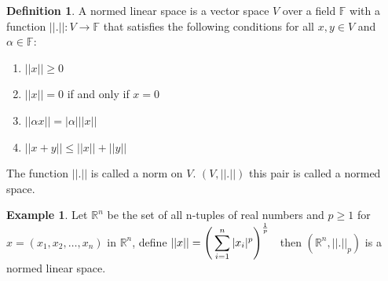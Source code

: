 \documentclass[11pt,a4paper]{article}
\theoremstyle{definition}
\newtheorem{defn}[thm]{Definition}
\newtheorem{exa}[thm]{Example}
\begin{document}
\begin{defn}
A normed linear space is a vector space $V$ over a field $\mathbb{F}$ with a function $||.||:V\rightarrow \mathbb{F}$ that satisfies the following conditions for all $x,y\in V$ and $\alpha \in \mathbb{F}$:
\begin{enumerate}
\item $||x||\geq 0$
\item $||x||=0$ if and only if $x=0$
\item $||\alpha x||=|\alpha|||x||$
\item $||x+y||\leq ||x||+ ||y||$
\end{enumerate}

The function $||.||$ is called a norm on $V$. $(V,||.||)$ this pair is called a normed space.

\end{defn}


\begin{exa}
Let $\mathbb{R}^n$ be the set of all n-tuples of real numbers and $p\geq 1$ for $x=(x_1,x_2,\dots,x_n)$ in $\mathbb{R}^n$, define \hspace{0.2cm}$\displaystyle{||x||=\Bigg(\sum^n_{i=1}|x_i|^p\Bigg)^\frac{1}{p}}\hspace{0.2cm}$ then $(\mathbb{R}^n,||.||_p)$ is a normed linear space.

\end{exa}
\end{document}
